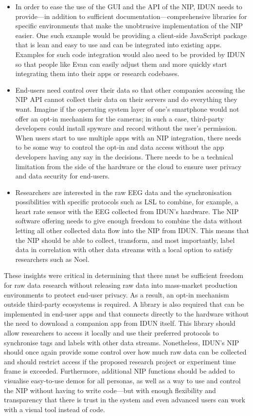\begin{itemize}
  \item In order to ease the use of the GUI and the API of the NIP, IDUN needs to provide—in addition to sufficient documentation—comprehensive libraries for specific environments that make the unobtrusive implementation of the NIP easier. One such example would be providing a client-side JavaScript package that is lean and easy to use and can be integrated into existing apps. Examples for such code integration would also need to be provided by IDUN so that people like Evan can easily adjust them and more quickly start integrating them into their apps or research codebases.
  \item End-users need control over their data so that other companies accessing the NIP API cannot collect their data on their servers and do everything they want. Imagine if the operating system layer of one’s smartphone would not offer an opt-in mechanism for the cameras; in such a case, third-party developers could install spyware and record without the user’s permission. When users start to use multiple apps with an NIP integration, there needs to be some way to control the opt-in and data access without the app developers having any say in the decisions. There needs to be a technical limitation from the side of the hardware or the cloud to ensure user privacy and data security for end-users.
  \item Researchers are interested in the raw EEG data and the synchronisation possibilities with specific protocols such as LSL to combine, for example, a heart rate sensor with the EEG collected from IDUN’s hardware. The NIP software offering needs to give enough freedom to combine the data without letting all other collected data flow into the NIP from IDUN. This means that the NIP should be able to collect, transform, and most importantly, label data in correlation with other data streams with a local option to satisfy researchers such as Noel.
\end{itemize}

These insights were critical in determining that there must be sufficient freedom for raw data research without releasing raw data into mass-market production environments to protect end-user privacy. As a result, an opt-in mechanism outside third-party ecosystems is required. A library is also required that can be implemented in end-user apps and that connects directly to the hardware without the need to download a companion app from IDUN itself. This library should allow researchers to access it locally and use their preferred protocols to synchronise tags and labels with other data streams. Nonetheless, IDUN’s NIP should once again provide some control over how much raw data can be collected and should restrict access if the proposed research project or experiment time frame is exceeded. Furthermore, additional NIP functions should be added to visualise easy-to-use demos for all personas, as well as a way to use and control the NIP without having to write code—but with enough flexibility and transparency that there is trust in the system and even advanced users can work with a visual tool instead of code.

